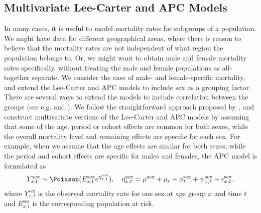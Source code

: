 \subsection{Multivariate Lee-Carter and APC Models}
\label{sec:multivariateAPC}
In many cases, it is useful to model mortality rates for subgroups of a population. We might have data for different geographical areas, where there is reason to believe that the mortality rates are not independent of what region the population belongs to. Or, we might want to obtain male and female mortality rates specifically, without treating the male and female populations as all-together separate. We consider the case of male- and female-specific mortality, and extend the Lee-Carter and APC models to include sex as a grouping factor. There are several ways to extend the models to include correlation between the groups (see e.g. \textcite{Wisniowski2015} and \textcite{RieblerHeldRue2012}). We follow the straightforward approach proposed by \textcite{rieblerHeld2010}, and construct multivariate versions of the Lee-Carter and APC models by assuming that some of the age, period or cohort effects are common for both sexes, while the overall mortality level and remaining effects are specific for each sex. For example, when we assume that the age effects are similar for both sexes, while the period and cohort effects are specific for males and females, the APC model is formulated as
\begin{equation}
    Y_{x,t}^{\text{sex}} \sim \Poisson(E_{x,t}^{\text{sex}}e^{\eta_{x,t}^{\text{sex}}}), \quad \eta_{x,t}^{\text{sex}} = \mu^{\text{sex}} + \rho_x + \phi_t^{\text{sex}} + \psi_{x,t}^{\text{sex}} + \epsilon_{x,t}^{\text{sex}},
\end{equation}
where $Y_{x,t}^{\text{sex}}$ is the observed mortality rate for one sex at age group $x$ and time $t$ and $E_{x,t}^{\text{sex}}$ is the corresponding population at risk. 